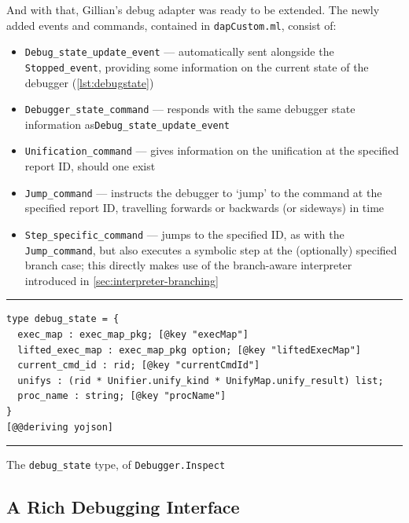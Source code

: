 And with that, Gillian's debug adapter was ready to be extended. The newly added
events and commands, contained in \texttt{dapCustom.ml}, consist of:
\begin{itemize}
  \item \texttt{Debug\_state\_update\_event} --- automatically sent alongside
        the \texttt{Stopped\_event}, providing some information on the current
        state of the debugger (\autoref{lst:debugstate})
  \item \texttt{Debugger\_state\_command} --- responds with the same debugger
        state information as\newline\texttt{Debug\_state\_update\_event}
  \item \texttt{Unification\_command} --- gives information on the unification
        at the specified report ID, should one exist
  \item \texttt{Jump\_command} --- instructs the debugger to `jump' to the
        command at the specified report ID, travelling forwards or backwards
        (or sideways) in time
  \item \texttt{Step\_specific\_command} --- jumps to the specified ID, as with
        the \texttt{Jump\_command}, but also executes a symbolic step at the
        (optionally) specified branch case; this directly makes use of the
        branch-aware interpreter introduced in
        \autoref{sec:interpreter-branching}
\end{itemize}

\begin{listing}[!ht]
\noindent\rule{\textwidth}{0.5pt}
\vspace{-0.6cm}
\begin{verbatim}
type debug_state = {
  exec_map : exec_map_pkg; [@key "execMap"]
  lifted_exec_map : exec_map_pkg option; [@key "liftedExecMap"]
  current_cmd_id : rid; [@key "currentCmdId"]
  unifys : (rid * Unifier.unify_kind * UnifyMap.unify_result) list;
  proc_name : string; [@key "procName"]
}
[@@deriving yojson]
\end{verbatim}
\vspace{-0.4cm}
\noindent\rule{\textwidth}{0.5pt}
\vspace{-0.6cm}
\caption{The \texttt{debug\_state} type, of \texttt{Debugger.Inspect}}
\label{lst:debugstate}
\end{listing}


\subsection{A Rich Debugging Interface}%
\label{sec:debug-interface}

